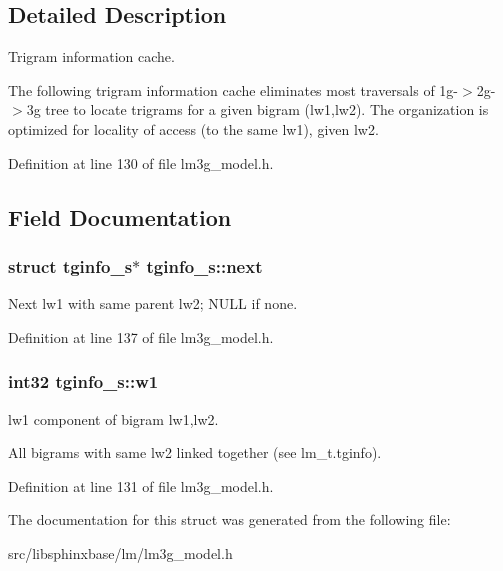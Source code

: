 \subsection{Detailed Description}
Trigram information cache. 

The following trigram information cache eliminates most traversals of 1g-$>$2g-$>$3g tree to locate trigrams for a given bigram (lw1,lw2). The organization is optimized for locality of access (to the same lw1), given lw2. 

Definition at line 130 of file lm3g\_\-model.h.

\subsection{Field Documentation}
\subsubsection[{next}]{\setlength{\rightskip}{0pt plus 5cm}struct {\bf tginfo\_\-s}$\ast$ {\bf tginfo\_\-s::next}\hspace{0.3cm}{\tt  [read]}}\label{structtginfo__s_184e60660a4c8168b5268260cd98ffa5}


Next lw1 with same parent lw2; NULL if none. 



Definition at line 137 of file lm3g\_\-model.h.
\subsubsection[{w1}]{\setlength{\rightskip}{0pt plus 5cm}int32 {\bf tginfo\_\-s::w1}}\label{structtginfo__s_a151a34891820c55e0fef60cc74b6e05}


lw1 component of bigram lw1,lw2. 

All bigrams with same lw2 linked together (see lm\_\-t.tginfo). 

Definition at line 131 of file lm3g\_\-model.h.

The documentation for this struct was generated from the following file:\begin{CompactItemize}
\item 
src/libsphinxbase/lm/lm3g\_\-model.h\end{CompactItemize}
